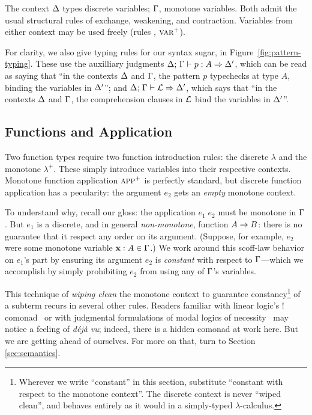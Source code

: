The context $\Delta$ types discrete variables; $\Gamma$, monotone variables. Both
admit the usual structural rules of exchange, weakening, and contraction.
Variables from either context may be used freely (rules , $\textsc{var}^+$).

For clarity, we also give typing rules for our syntax sugar, in
Figure~\ref{fig:pattern-typing}. These use the auxilliary judgments
${\Delta};\,{\Gamma}\vdash {p}:{A} \Rightarrow {\Delta'}$, which can be read as saying that ``in the contexts
$\Delta$ and $\Gamma$, the pattern $p$ typechecks at type $A$, binding the variables
in $\Delta'$''; and ${\Delta};\,{\Gamma}\vdash {\ensuremath{\mathcal{L}}} \Rightarrow {\Delta'}$, which says that ``in the
contexts $\Delta$ and $\Gamma$, the comprehension clauses in $\mathcal{L}$ bind the
variables in $\Delta'$''.

\subsection{Functions and Application}
Two function types require two function introduction rules: the discrete
$\lambda$ and the monotone $\lambda^+$. These simply introduce variables into
their respective contexts. Monotone function application $\textsc{app}^+$ is
perfectly standard, but discrete function application  has a pecularity:
the argument $e_2$ gets an \emph{empty} monotone context.

To understand why, recall our gloss: the application $e_1\;e_2$ must be monotone
in $\Gamma$. But $e_1$ is a discrete, and in general \emph{non-monotone}, function
$A \to B$: there is no guarantee that it respect any order on its argument.
(Suppose, for example, $e_2$ were some monotone variable $\mathbf{x} : A \in \Gamma$.)
We work around this scoff-law behavior on $e_1$'s part by ensuring its argument
$e_2$ is \emph{constant} with respect to $\Gamma$---which we accomplish by simply
prohibiting $e_2$ from using any of $\Gamma$'s variables.

This technique of \emph{wiping clean} the monotone context to guarantee
constancy\footnote{Wherever we write ``constant'' in this section, substitute
  ``constant with respect to the monotone context''. The discrete context is
  never ``wiped clean'', and behaves entirely as it would in a simply-typed
  $\lambda$-calculus.} of a subterm recurs in several other rules. Readers
familiar with linear logic's $!$ comonad~\cite{linearlogic} or with judgmental
formulations of modal logics of necessity~\cite{jrml} may notice a feeling of
\textit{d\'ej\`a vu}; indeed, there is a hidden comonad at work here. But we are
getting ahead of ourselves. For more on that, turn to Section
\ref{sec:semantics}.

